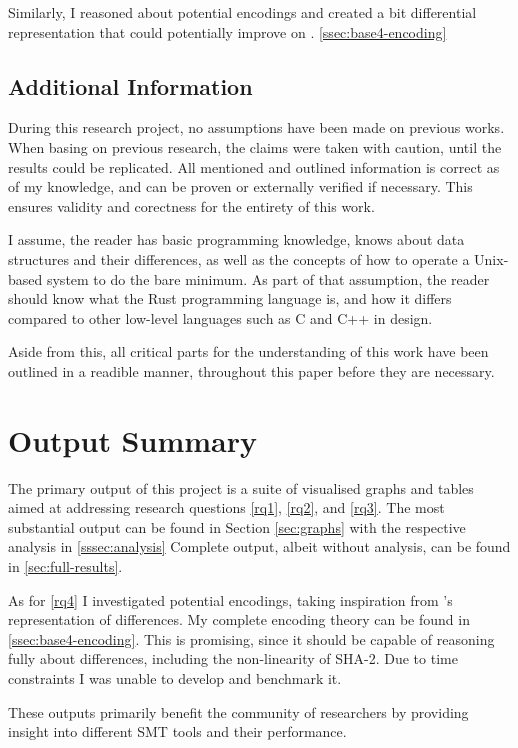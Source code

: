 \documentclass[a4paper]{report}
\begin{document}
Similarly, I reasoned about potential encodings and created a bit differential representation that could potentially improve on \cite{li_2024}. \ref{ssec:base4-encoding}

\pagebreak
\section{Additional Information}
During this research project, no assumptions have been made on previous works.
When basing on previous research, the claims were taken with caution, until the results could be replicated.
All mentioned and outlined information is correct as of my knowledge, and can be proven or externally verified if necessary.
This ensures validity and corectness for the entirety of this work.

I assume, the reader has basic programming knowledge, knows about data structures and their differences, as well as the concepts of how to operate a Unix-based system to do the bare minimum.
As part of that assumption, the reader should know what the Rust programming language is, and how it differs compared to other low-level languages such as C and C++ in design.

Aside from this, all critical parts for the understanding of this work have been outlined in a readible manner, throughout this paper before they are necessary.


\chapter{Output Summary}
The primary output of this project is a suite of visualised graphs and tables aimed at addressing research questions \ref{rq1}, \ref{rq2}, and \ref{rq3}.
The most substantial output can be found in Section \ref{sec:graphs} with the respective analysis in \ref{sssec:analysis}
Complete output, albeit without analysis, can be found in \ref{sec:full-results}.

As for \ref{rq4} I investigated potential encodings, taking inspiration from \cite{li_2024}'s representation of differences.
My complete encoding theory can be found in \ref{ssec:base4-encoding}.
This is promising, since it should be capable of reasoning fully about differences, including the non-linearity of SHA-2.
Due to time constraints I was unable to develop and benchmark it.

These outputs primarily benefit the community of researchers by providing insight into different SMT tools and their performance.
\end{document}
